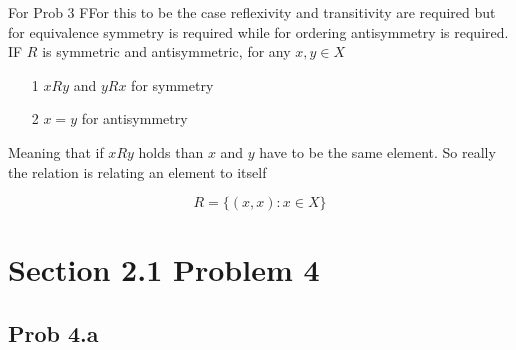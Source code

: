 \documentclass{report}
\begin{document}
\begin{RemarkWithLily}{For Prob 3}
  FFor this to be the case reflexivity and transitivity are required but for equivalence symmetry is required while for 
  ordering antisymmetry is required.    
  \bigskip 
  IF $R$ is symmetric and antisymmetric, for any $x,y \in X$
  \begin{itemize}
    \item [1] $xRy$ and $yRx$ for symmetry 
    \item [2] $x=y$ for antisymmetry
  \end{itemize}                    
  Meaning that if $xRy$ holds than $x$ and $y$ have to be the same element. So really the relation is relating an element 
  to itself 
  
  \bigskip 
  \[ R = \{ (x,x) : x \in X \}\] 
\end{RemarkWithLily}

\newpage 

\section*{Section 2.1 Problem 4}



\subsection*{Prob 4.a}
\end{document}
